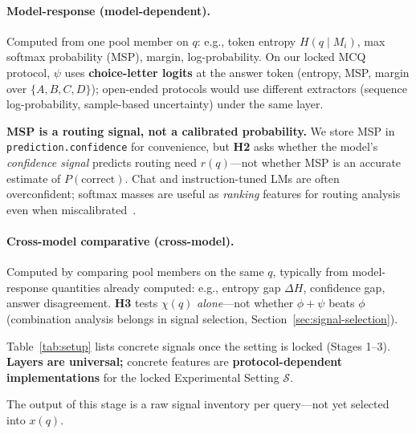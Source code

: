 \paragraph{Model-response (model-dependent).}
Computed from one pool member on $q$: e.g., token entropy $H(q\mid M_i)$, max softmax probability (MSP), margin, log-probability.
On our locked MCQ protocol, $\psi$ uses \textbf{choice-letter logits} at the answer token (entropy, MSP, margin over $\{A,B,C,D\}$); open-ended protocols would use different extractors (sequence log-probability, sample-based uncertainty) under the same layer.

\textbf{MSP is a routing signal, not a calibrated probability.}
We store MSP in \texttt{prediction.confidence} for convenience, but \textbf{H2} asks whether the model's \emph{confidence signal} predicts routing need $r(q)$---not whether MSP is an accurate estimate of $P(\text{correct})$.
Chat and instruction-tuned LMs are often overconfident; softmax masses are useful as \emph{ranking} features for routing analysis even when miscalibrated~\citep{plaut2024calibration}.

\paragraph{Cross-model comparative (cross-model).}
Computed by comparing pool members on the same $q$, typically from model-response quantities already computed: e.g., entropy gap $\Delta H$, confidence gap, answer disagreement.
\textbf{H3} tests $\chi(q)$ \emph{alone}---not whether $\phi{+}\psi$ beats $\phi$ (combination analysis belongs in signal selection, Section~\ref{sec:signal-selection}).

Table~\ref{tab:setup} lists concrete signals once the setting is locked (Stages 1--3).
\textbf{Layers are universal;} concrete features are \textbf{protocol-dependent implementations} for the locked Experimental Setting $\mathcal{S}$.

The output of this stage is a raw signal inventory per query---not yet selected into $x(q)$.
